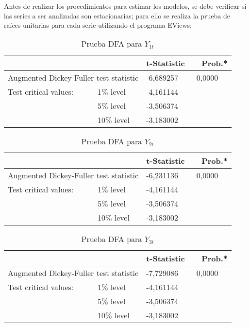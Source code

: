 Antes de realizar los procedimientos para estimar los modelos, se debe verificar si las series a ser analizadas son estacionarias; para ello se realiza la prueba de ra\'{i}ces unitarias para cada serie utilizando el programa EViews:

\begin{table}[H]
\centering
\begin{tabular}{p{110pt}p{70pt}ll}\hline\hline
& & t-Statistic & ~~Prob.* \\ \hline \hline
\multicolumn{2}{l}{Augmented Dickey-Fuller test statistic} & -6,689257& ~0,0000 \\ \hline
Test critical values: & 1$\%$ level & -4,161144 & \\
& 5$\%$ level & -3,506374 & \\
& 10$\%$ level & -3,183002 & \\ \hline \hline
\end{tabular}
\caption{Prueba DFA para $Y_{1t}$}
\label{tab14}
\end{table}

\begin{table}[H]
\centering
\begin{tabular}{p{110pt}p{70pt}ll}\hline\hline
& & t-Statistic & ~~Prob.* \\ \hline \hline
\multicolumn{2}{l}{Augmented Dickey-Fuller test statistic} & -6,231136 & ~0,0000 \\ \hline
Test critical values: & 1$\%$ level & -4,161144 & \\
& 5$\%$ level & -3,506374 & \\
& 10$\%$ level & -3,183002 & \\ \hline \hline
\end{tabular}
\caption{Prueba DFA para $Y_{2t}$}
\label{tab15}
\end{table}

\begin{table}[H]
\centering
\begin{tabular}{p{110pt}p{70pt}ll}\hline\hline
& & t-Statistic & ~~Prob.* \\ \hline \hline
\multicolumn{2}{l}{Augmented Dickey-Fuller test statistic} & -7,729086 & ~0,0000 \\ \hline
Test critical values: & 1$\%$ level & -4,161144 & \\
& 5$\%$ level & -3,506374 & \\
& 10$\%$ level & -3,183002 & \\ \hline \hline
\end{tabular}
\caption{Prueba DFA para $Y_{3t}$}
\label{tab16}
\end{table}

